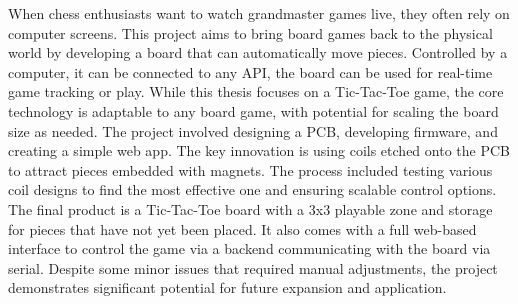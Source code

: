 \begin{spacing}{0.956}
	\vspace{0.5cm}

	When chess enthusiasts want to watch grandmaster games live, they often rely on computer screens. This project aims to bring board games back to the physical world by developing a board that can automatically move pieces. Controlled by a computer, it can be connected to any API, the board can be used for real-time game tracking or play. While this thesis focuses on a Tic-Tac-Toe game, the core technology is adaptable to any board game, with potential for scaling the board size as needed.
	The project involved designing a PCB, developing firmware, and creating a simple web app. The key innovation is using coils etched onto the PCB to attract pieces embedded with magnets. The process included testing various coil designs to find the most effective one and ensuring scalable control options. The final product is a Tic-Tac-Toe board with a 3x3 playable zone  and storage for pieces that have not yet been placed. It also comes with a full web-based interface to control the game via a backend communicating with the board via serial. Despite some minor issues that required manual adjustments, the project demonstrates significant potential for future expansion and application.



\end{spacing}
